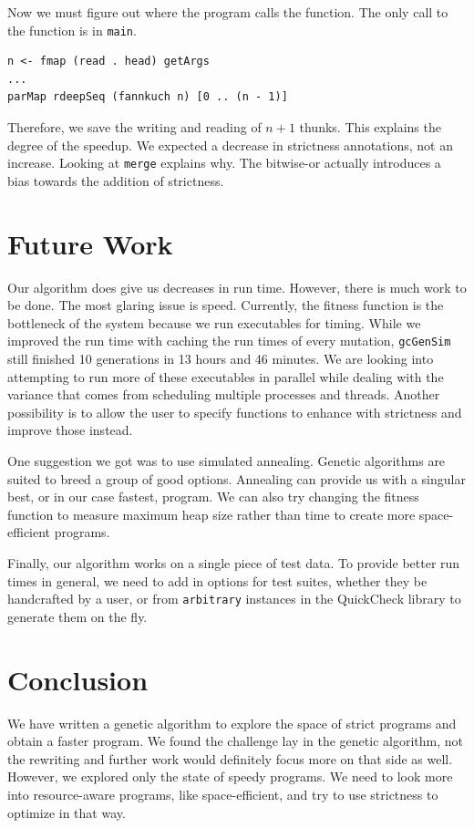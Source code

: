 \documentclass[preprint,nocopyrightspace]{sigplanconf}
\begin{document}
Now we must figure out where the program calls the function. The only call to the function is in \lstinline!main!.
\begin{lstlisting}
n <- fmap (read . head) getArgs
...
parMap rdeepSeq (fannkuch n) [0 .. (n - 1)]
\end{lstlisting}

Therefore, we save the writing and reading of $n+1$ thunks. This explains the degree of the speedup. We expected a decrease in strictness annotations, not an increase. Looking at \lstinline!merge! explains why. The bitwise-or actually introduces a bias towards the addition of strictness.


\section{Future Work}\label{sec:futr}
Our algorithm does give us decreases in run time. However, there is much work to be done. The most glaring issue is speed. Currently, the fitness function is the bottleneck of the system because we run executables for timing. While we improved the run time with caching the run times of every mutation, \lstinline!gcGenSim! still finished 10 generations in 13 hours and 46 minutes. We are looking into attempting to run more of these executables in parallel while dealing with the variance that comes from scheduling multiple processes and threads. Another possibility is to allow the user to specify functions to enhance with strictness and improve those instead.

One suggestion we got was to use simulated annealing. Genetic algorithms are suited to breed a group of good options. Annealing can provide us with a singular best, or in our case fastest, program. We can also try changing the fitness function to measure maximum heap size rather than time to create more space-efficient programs.

Finally, our algorithm works on a single piece of test data. To provide better run times in general, we need to add in options for test suites, whether they be handcrafted by a user, or from \lstinline!arbitrary! instances in the QuickCheck library to generate them on the fly.
\section{Conclusion}\label{sec:conc}
We have written a genetic algorithm to explore the space of strict programs and obtain a faster program. We found the challenge lay in the genetic algorithm, not the rewriting and further work would definitely focus more on that side as well. However, we explored only the state of speedy programs. We need to look more into resource-aware programs, like space-efficient, and try to use strictness to optimize in that way.
%
\end{document}
